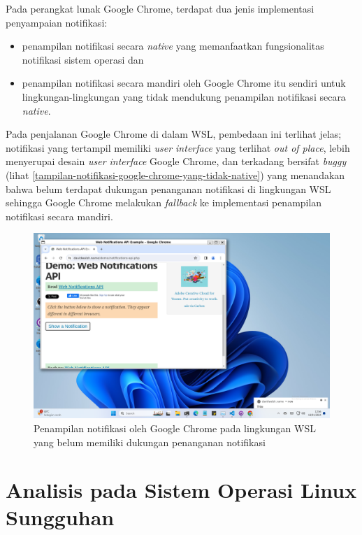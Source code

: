 Pada perangkat lunak Google Chrome, terdapat dua jenis implementasi penyampaian notifikasi:
\begin{itemize}
    \item penampilan notifikasi secara \textit{native} yang memanfaatkan fungsionalitas notifikasi sistem operasi dan
    \item penampilan notifikasi secara mandiri oleh Google Chrome itu sendiri untuk lingkungan-lingkungan yang tidak mendukung penampilan notifikasi secara \textit{native}.
\end{itemize}
Pada penjalanan Google Chrome di dalam WSL, pembedaan ini terlihat jelas; notifikasi yang tertampil memiliki \textit{user interface} yang terlihat \textit{out of place}, lebih menyerupai desain \textit{user interface} Google Chrome, dan terkadang bersifat \textit{buggy} (lihat \autoref{tampilan-notifikasi-google-chrome-yang-tidak-native}) yang menandakan bahwa belum terdapat dukungan penanganan notifikasi di lingkungan WSL sehingga Google Chrome melakukan \textit{fallback} ke implementasi penampilan notifikasi secara mandiri.

\begin{figure}
    \centering
    \includegraphics[width=1\linewidth]{assets/Screenshot 2024-01-18 125649.png}
    \caption{Penampilan notifikasi oleh Google Chrome pada lingkungan WSL yang belum memiliki dukungan penanganan notifikasi}
    \label{tampilan-notifikasi-google-chrome-yang-tidak-native}
\end{figure}

\section{Analisis pada Sistem Operasi Linux Sungguhan}


